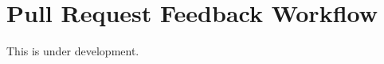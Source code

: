 \chapter{Pull Request Feedback Workflow}\label{sec:pull-request-workflows}

This is under development.